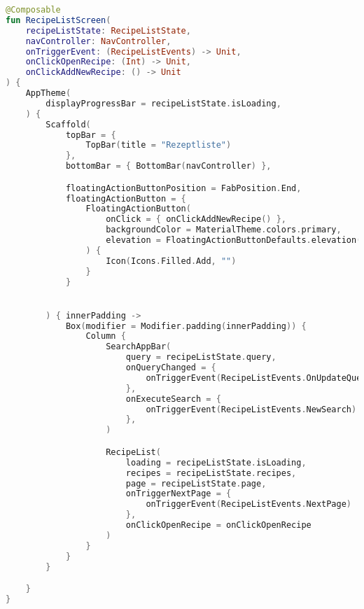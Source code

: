\begin{lstlisting}[caption={RecipeList Screen},label={lst:recipe_list_screen}, language=kotlin]
@Composable
fun RecipeListScreen(
    recipeListState: RecipeListState,
    navController: NavController,
    onTriggerEvent: (RecipeListEvents) -> Unit,
    onClickOpenRecipe: (Int) -> Unit,
    onClickAddNewRecipe: () -> Unit
) {
    AppTheme(
        displayProgressBar = recipeListState.isLoading,
    ) {
        Scaffold(
            topBar = {
                TopBar(title = "Rezeptliste")
            },
            bottomBar = { BottomBar(navController) },

            floatingActionButtonPosition = FabPosition.End,
            floatingActionButton = {
                FloatingActionButton(
                    onClick = { onClickAddNewRecipe() },
                    backgroundColor = MaterialTheme.colors.primary,
                    elevation = FloatingActionButtonDefaults.elevation(6.dp)
                ) {
                    Icon(Icons.Filled.Add, "")
                }
            }


        ) { innerPadding ->
            Box(modifier = Modifier.padding(innerPadding)) {
                Column {
                    SearchAppBar(
                        query = recipeListState.query,
                        onQueryChanged = {
                            onTriggerEvent(RecipeListEvents.OnUpdateQuery(it))
                        },
                        onExecuteSearch = {
                            onTriggerEvent(RecipeListEvents.NewSearch)
                        },
                    )

                    RecipeList(
                        loading = recipeListState.isLoading,
                        recipes = recipeListState.recipes,
                        page = recipeListState.page,
                        onTriggerNextPage = {
                            onTriggerEvent(RecipeListEvents.NextPage)
                        },
                        onClickOpenRecipe = onClickOpenRecipe
                    )
                }
            }
        }

    }
}
\end{lstlisting}


